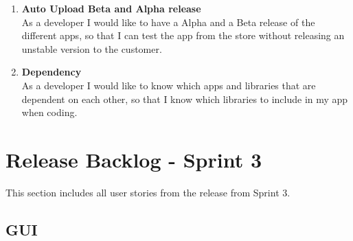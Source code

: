\begin{enumerate}
	\item \textbf{Auto Upload Beta and Alpha release}\\
	As a developer I would like to have a Alpha and a Beta release of the different apps, so that I can test the app from the store without releasing an unstable version to the customer.
	
	\item \textbf{Dependency}\\
	As a developer I would like to know which apps and libraries that are dependent on each other, so that I know which libraries to include in my app when coding.
\end{enumerate}

\section{Release Backlog - Sprint 3}
This section includes all user stories from the release from Sprint 3.

\subsection{GUI}

